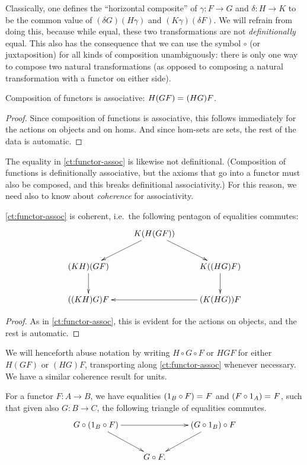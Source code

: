 Classically, one defines the ``horizontal composite'' of $\gamma:F\to G$ and $\delta:H\to K$ to be the common value of ${(\delta G)(H\gamma)}$ and ${(K\gamma)(\delta F)}$.
We will refrain from doing this, because while equal, these two transformations are not \emph{definitionally} equal.
This also has the consequence that we can use the symbol $\circ$ (or juxtaposition) for all kinds of composition unambiguously: there is only one way to compose two natural transformations (as opposed to composing a natural transformation with a functor on either side).

\begin{lem}\label{ct:functor-assoc}
  Composition of functors is associative: $H(GF) =_{} (HG)F$.
\end{lem}
\begin{proof}
  Since composition of functions is associative, this follows immediately for the actions on objects and on homs.
  And since hom-sets are sets, the rest of the data is automatic.
\end{proof}

The equality in \autoref{ct:functor-assoc} is likewise not definitional.
(Composition of functions is definitionally associative, but the axioms that go into a functor must also be composed, and this breaks definitional associativity.)  For this reason, we need also to know about \emph{coherence} for associativity.

\begin{lem}\label{ct:pentagon}
  \autoref{ct:functor-assoc} is coherent, i.e.\ the following pentagon of equalities commutes:
  \[ \xymatrix{ & K(H(GF)) \ar[dl] \ar[dr]\\
    (KH)(GF) \ar[d] && K((HG)F) \ar[d]\\
    ((KH)G)F && (K(HG))F \ar[ll] }
  \]
\end{lem}
\begin{proof}
  As in \autoref{ct:functor-assoc}, this is evident for the actions on objects, and the rest is automatic.
\end{proof}

We will henceforth abuse notation by writing $H\circ G\circ F$ or $HGF$ for either $H(GF)$ or $(HG)F$, transporting along \autoref{ct:functor-assoc} whenever necessary.
We have a similar coherence result for units.

\begin{lem}\label{ct:units}
  For a functor $F:A\to B$, we have equalities $(1_B\circ F) =_{} F$ and $(F\circ 1_A) =_{} F$, such that given also $G:B\to C$, the following triangle of equalities commutes.
  \[ \xymatrix{
    G\circ (1_B \circ F) \ar[rr] \ar[dr] &&
    (G\circ 1_B)\circ F \ar[dl] \\
    & G \circ F.}
  \]
\end{lem}


